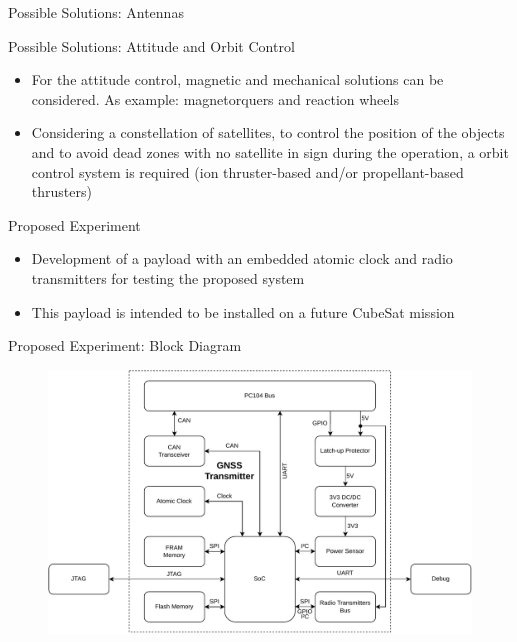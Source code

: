 \begin{frame}{Possible Solutions: Antennas}
\end{frame}

\begin{frame}{Possible Solutions: Attitude and Orbit Control}

    \begin{itemize}
        \item For the attitude control, magnetic and mechanical solutions can be considered. As example: magnetorquers and reaction wheels
        \vspace{0.2cm}
        \item Considering a constellation of satellites, to control the position of the objects and to avoid dead zones with no satellite in sign during the operation, a orbit control system is required (ion thruster-based and/or propellant-based thrusters)
    \end{itemize}

\end{frame}

\begin{frame}{Proposed Experiment}

    \begin{itemize}
        \item Development of a payload with an embedded atomic clock and radio transmitters for testing the proposed system
        \vspace{0.5cm}
        \item This payload is intended to be installed on a future CubeSat mission
    \end{itemize}

\end{frame}

\begin{frame}{Proposed Experiment: Block Diagram}

    \begin{figure}[!ht]
        \begin{center}
            \includegraphics[scale=0.5]{figures/block-diagram}
        \end{center}
    \end{figure}

\end{frame}

